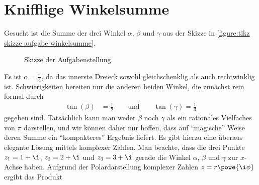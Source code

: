 \documentclass[english, parskip=full]{scrartcl}
\begin{document}
\section{Knifflige Winkelsumme}
Gesucht ist die Summe der drei Winkel $\alpha$, $\beta$ und $\gamma$ aus der Skizze in \autoref{figure:tikz skizze aufgabe winkelsumme}.\\
\begin{figure}[!ht]
\centering
{}
\caption{Skizze der Aufgabenstellung.}
\label{figure:tikz skizze aufgabe winkelsumme}
\end{figure}
Es ist $\alpha = \frac{\pi}{4}$, da das innerste Dreieck sowohl gleichschenklig als auch rechtwinklig ist.
Schwierigkeiten bereiten nur die anderen beiden Winkel, die zunächst rein formal durch
\begin{align}
\tan(\beta) &= \frac{1}{2}\qquad \text{und} \qquad \tan(\gamma) = \frac{1}{3}
\end{align}
gegeben sind.
Tatsächlich kann man weder $\beta$ noch $\gamma$ als ein rationales Vielfaches von $\pi$ darstellen, und wir können daher nur hoffen, dass auf ``magische'' Weise deren Summe ein ``kompakteres'' Ergebnis liefert.
Es gibt hierzu eine überaus elegante Lösung mittels komplexer Zahlen.
Man beachte, dass die drei Punkte $z_1 = 1 + \i$, $z_2 = 2 + \i$ und $z_3 = 3 + \i$ gerade die Winkel $\alpha$, $\beta$ und $\gamma$ zur $x$-Achse haben.
Aufgrund der Polardarstellung komplexer Zahlen $z=r\powe{\i \phi}$ ergibt das Produkt
\end{document}
